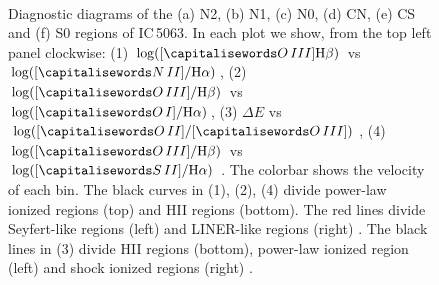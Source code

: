 \documentclass[../main.tex]{subfiles}
\begin{document}
\begin{figure}
\\
\caption[]{Diagnostic diagrams of the (a) N2, (b) N1, (c) N0, (d) CN, (e) CS and (f) S0 regions of IC\,5063.  In each plot we show, from the top left panel clockwise: (1) $\log([\ion{O}{III}] \Hb)$ vs $\log([\ion{N}{II}]/ \Ha)$, (2) $\log([\ion{O}{III}]/ \Hb)$ vs $\log([\ion{O}{I}]/ \Ha)$, (3) $\Delta E$ vs $\log([\ion{O}{II}]/[\ion{O}{III}])$, (4) $\log([\ion{O}{III}]/ \Hb)$ vs $\log([\ion{S}{II}]/ \Ha)$ \citep{Baldwin81, Veilleux87}. The colorbar shows the velocity of each bin. The black curves in (1), (2), (4) divide power-law ionized regions (top) and HII regions (bottom). The red lines divide Seyfert-like regions (left) and LINER-like regions (right) \citep{Kewley06}. The black lines in (3) divide HII regions (bottom), power-law ionized region (left) and shock ionized regions (right) \citep{Baldwin81}.  }
\label{fig:diag_css0}
\end{figure}
\end{document}
